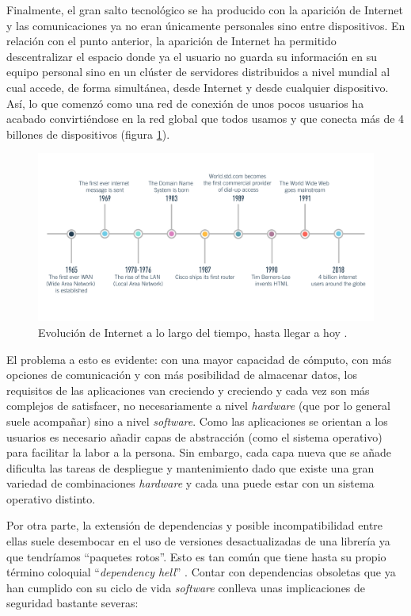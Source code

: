 Finalmente, el gran salto tecnológico se ha producido con la aparición de Internet y
las comunicaciones ya no eran únicamente personales sino entre dispositivos. En relación
con el punto anterior, la aparición de Internet ha permitido descentralizar el espacio
donde ya el usuario no guarda su información en su equipo personal sino en un clúster
de servidores distribuidos a nivel mundial al cual accede, de forma simultánea,
desde Internet y desde cualquier dispositivo. Así, lo que comenzó como una red de
conexión de unos pocos usuarios ha acabado convirtiéndose en la red global que
todos usamos y que conecta más de 4 billones de dispositivos (figura \ref{fig:internet-evo}).

\begin{figure}[H]
    \centering
    \includegraphics[width=.9\linewidth]{pictures/internet-timeline.png}
    \caption{Evolución de Internet a lo largo del tiempo, hasta llegar a hoy \cite{HowBecomeWeb}.}
    \label{fig:internet-evo}
\end{figure}

El problema a esto es evidente: con una mayor capacidad de cómputo, con más opciones
de comunicación y con más posibilidad de almacenar datos, los requisitos de las
aplicaciones van creciendo y creciendo y cada vez son más complejos de satisfacer,
no necesariamente a nivel \textit{hardware} (que por lo general suele acompañar)
sino a nivel \textit{software}. Como las aplicaciones se orientan a los usuarios
es necesario añadir capas de abstracción (como el sistema operativo) para facilitar
la labor a la persona. Sin embargo, cada capa nueva que se añade dificulta las tareas
de despliegue y mantenimiento dado que existe una gran variedad de combinaciones
\textit{hardware} y cada una puede estar con un sistema operativo distinto.

Por otra parte, la extensión de dependencias y posible incompatibilidad entre ellas
suele desembocar en el uso de versiones desactualizadas de una librería ya que tendríamos
``paquetes rotos''. Esto es tan común que tiene hasta su propio
término coloquial ``\textit{dependency hell}'' \cite{DependencyHell2021}. Contar con
dependencias obsoletas que ya han cumplido con su ciclo de vida \textit{software}
conlleva unas implicaciones de seguridad bastante severas:

